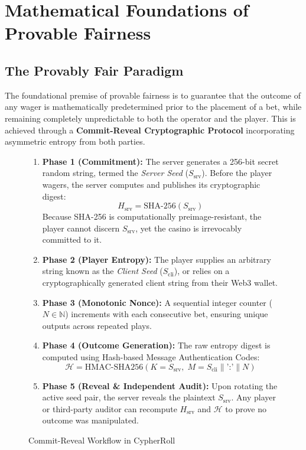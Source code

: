 \section{Mathematical Foundations of Provable Fairness}

\subsection{The Provably Fair Paradigm}
The foundational premise of provable fairness is to guarantee that the outcome of any wager is mathematically predetermined prior to the placement of a bet, while remaining completely unpredictable to both the operator and the player. This is achieved through a \textbf{Commit-Reveal Cryptographic Protocol} incorporating asymmetric entropy from both parties.

\begin{figure}[h!]
\centering
\begin{tcolorbox}[colback=gray!5,colframe=blue!70!black,title=\textbf{Protocol 3.1: The Cryptographic Commit-Reveal Handshake}]
\begin{enumerate}[leftmargin=1.5em]
    \item \textbf{Phase 1 (Commitment):} The server generates a 256-bit secret random string, termed the \textit{Server Seed} ($S_{\text{srv}}$). Before the player wagers, the server computes and publishes its cryptographic digest:
    $$H_{\text{srv}} = \text{SHA-256}(S_{\text{srv}})$$
    Because SHA-256 is computationally preimage-resistant, the player cannot discern $S_{\text{srv}}$, yet the casino is irrevocably committed to it.
    \item \textbf{Phase 2 (Player Entropy):} The player supplies an arbitrary string known as the \textit{Client Seed} ($S_{\text{cli}}$), or relies on a cryptographically generated client string from their Web3 wallet.
    \item \textbf{Phase 3 (Monotonic Nonce):} A sequential integer counter ($N \in \mathbb{N}$) increments with each consecutive bet, ensuring unique outputs across repeated plays.
    \item \textbf{Phase 4 (Outcome Generation):} The raw entropy digest is computed using Hash-based Message Authentication Codes:
    $$\mathcal{H} = \text{HMAC-SHA256}(K = S_{\text{srv}}, \; M = S_{\text{cli}} \parallel \text{':'} \parallel N)$$
    \item \textbf{Phase 5 (Reveal \& Independent Audit):} Upon rotating the active seed pair, the server reveals the plaintext $S_{\text{srv}}$. Any player or third-party auditor can recompute $H_{\text{srv}}$ and $\mathcal{H}$ to prove no outcome was manipulated.
\end{enumerate}
\end{tcolorbox}
\caption{Commit-Reveal Workflow in CypherRoll}
\end{figure}

